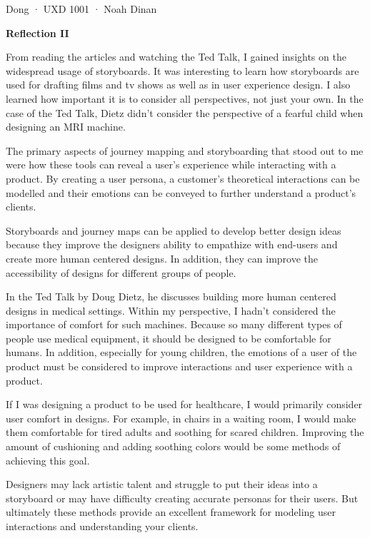 \documentclass[12pt]{article}
\begin{document}

\newpage
\noindent
Dong  ·  UXD 1001  ·  Noah Dinan

\begin{center}
    \textbf{Reflection II}
\end{center}

\setlength{\parindent}{0.5in}

From reading the articles and watching the Ted Talk, I gained insights on the widespread usage of storyboards.
It was interesting to learn how storyboards are used for drafting films and tv shows as well as in user experience design.
I also learned how important it is to consider all perspectives, not just your own.
In the case of the Ted Talk, Dietz didn't consider the perspective of a fearful child when designing an MRI machine.

The primary aspects of journey mapping and storyboarding that stood out to me were how
these tools can reveal a user's experience while interacting with a product. By creating a user
persona, a customer's theoretical interactions can be modelled and their emotions can be conveyed
to further understand a product's clients.

Storyboards and journey maps can be applied to develop better design ideas because they improve the
designers ability to empathize with end-users and create more human centered designs.
In addition, they can improve the accessibility of designs for different groups of people.

In the Ted Talk by Doug Dietz, he discusses building more human centered designs in medical settings.
Within my perspective, I hadn't considered the importance of comfort for such machines. Because so many
different types of people use medical equipment, it should be designed to be comfortable for humans.
In addition, especially for young children, the emotions of a user of the product must be considered to improve
interactions and user experience with a product.

If I was designing a product to be used for healthcare, I would primarily consider user comfort in designs.
For example, in chairs in a waiting room, I would make them comfortable for tired adults and soothing for
scared children. Improving the amount of cushioning and adding soothing colors would be some methods of
achieving this goal.

Designers may lack artistic talent and struggle to put their ideas into a storyboard or
may have difficulty creating accurate personas for their users. But ultimately these methods
provide an excellent framework for modeling user interactions and understanding your clients.
\end{document}
